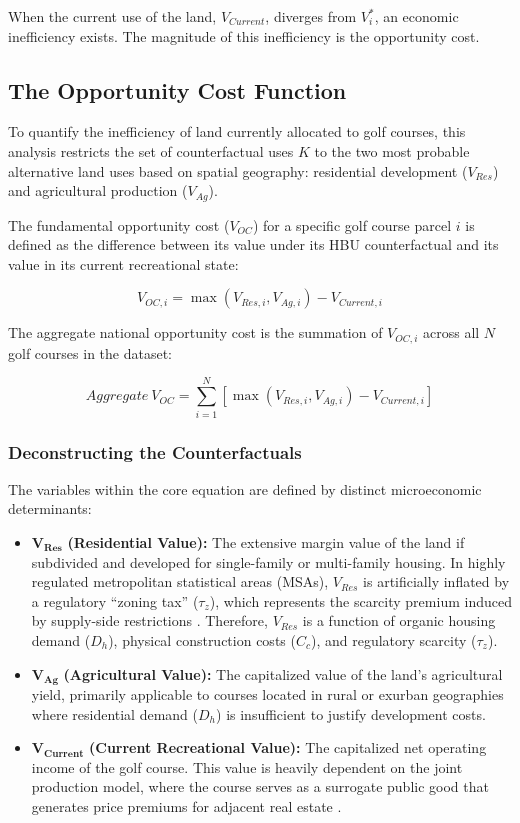 \documentclass[10pt, letterpaper]{article}
\begin{document}
When the current use of the land, $V_{Current}$, diverges from $V_i^*$, an economic inefficiency exists. The magnitude of this inefficiency is the opportunity cost.

\subsection{The Opportunity Cost Function}
To quantify the inefficiency of land currently allocated to golf courses, this analysis restricts the set of counterfactual uses $K$ to the two most probable alternative land uses based on spatial geography: residential development ($V_{Res}$) and agricultural production ($V_{Ag}$). 

The fundamental opportunity cost ($V_{OC}$) for a specific golf course parcel $i$ is defined as the difference between its value under its HBU counterfactual and its value in its current recreational state:

\begin{equation}
    V_{OC, i} = \max(V_{Res, i}, V_{Ag, i}) - V_{Current, i}
\end{equation}

The aggregate national opportunity cost is the summation of $V_{OC, i}$ across all $N$ golf courses in the dataset:

\begin{equation}
    Aggregate~V_{OC} = \sum_{i=1}^{N} \left[ \max(V_{Res, i}, V_{Ag, i}) - V_{Current, i} \right]
\end{equation}

\subsubsection{Deconstructing the Counterfactuals}
The variables within the core equation are defined by distinct microeconomic determinants:

\begin{itemize}
    \item $\mathbf{V_{Res}}$ \textbf{(Residential Value):} The extensive margin value of the land if subdivided and developed for single-family or multi-family housing. In highly regulated metropolitan statistical areas (MSAs), $V_{Res}$ is artificially inflated by a regulatory ``zoning tax'' ($\tau_z$), which represents the scarcity premium induced by supply-side restrictions \parencite{Glaeser2005, Gyourko2021}. Therefore, $V_{Res}$ is a function of organic housing demand ($D_h$), physical construction costs ($C_c$), and regulatory scarcity ($\tau_z$).
    \item $\mathbf{V_{Ag}}$ \textbf{(Agricultural Value):} The capitalized value of the land's agricultural yield, primarily applicable to courses located in rural or exurban geographies where residential demand ($D_h$) is insufficient to justify development costs.
    \item $\mathbf{V_{Current}}$ \textbf{(Current Recreational Value):} The capitalized net operating income of the golf course. This value is heavily dependent on the joint production model, where the course serves as a surrogate public good that generates price premiums for adjacent real estate \parencite{Limehouse2012}. 
\end{itemize}
\end{document}
